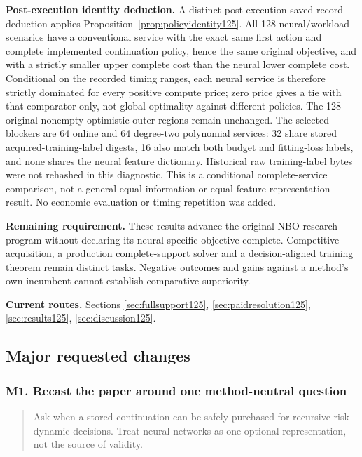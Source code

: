 \noindent\textbf{Post-execution identity deduction.} A distinct post-execution saved-record deduction applies Proposition~\ref{prop:policyidentity125}. All 128 neural/workload scenarios have a conventional service with the exact same first action and complete implemented continuation policy, hence the same original objective, and with a strictly smaller upper complete cost than the neural lower complete cost. Conditional on the recorded timing ranges, each neural service is therefore strictly dominated for every positive compute price; zero price gives a tie with that comparator only, not global optimality against different policies. The 128 original nonempty optimistic outer regions remain unchanged. The selected blockers are 64 online and 64 degree-two polynomial services: 32 share stored acquired-training-label digests, 16 also match both budget and fitting-loss labels, and none shares the neural feature dictionary. Historical raw training-label bytes were not rehashed in this diagnostic. This is a conditional complete-service comparison, not a general equal-information or equal-feature representation result. No economic evaluation or timing repetition was added.

\noindent\textbf{Remaining requirement.} These results advance the original NBO research program without declaring its neural-specific objective complete. Competitive acquisition, a production complete-support solver and a decision-aligned training theorem remain distinct tasks. Negative outcomes and gains against a method's own incumbent cannot establish comparative superiority.

\noindent\textbf{Current routes.} Sections \ref{sec:fullsupport125}, \ref{sec:paidresolution125}, \ref{sec:results125}, \ref{sec:discussion125}.

\subsection{Major requested changes}

\subsubsection{M1. Recast the paper around one method-neutral question}

\begin{quote}\small
Ask when a stored continuation can be safely purchased for recursive-risk dynamic decisions. Treat neural networks as one optional representation, not the source of validity.
\end{quote}

